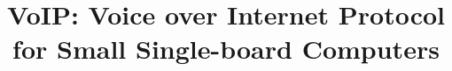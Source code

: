 \documentclass[conference]{IEEEtran}
\begin{document}
	
	
	
	\title{VoIP: Voice over Internet Protocol for Small Single-board Computers}
	
	
	\maketitle
	\thispagestyle{plain}
	\pagestyle{plain}
	
	
	
	
	
	
	
	

	
	
	

%		
	
%	
	
%	
	
%	
	
		
	
	
%	
	
%	
%	
	
	\appendix
	
	
	

	
\end{document}

